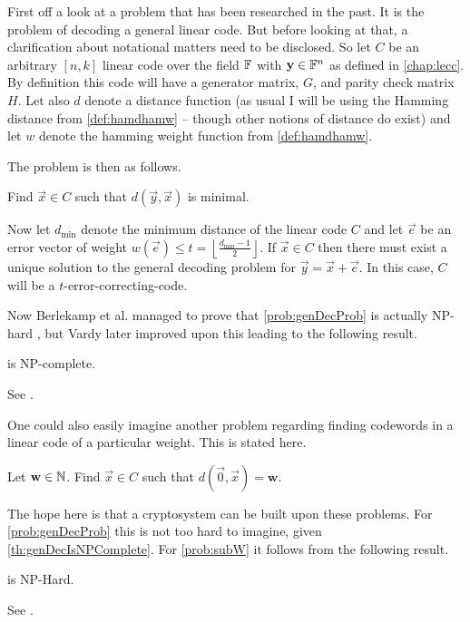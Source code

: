 First off a look at a problem that has been researched in the past. It is the problem of decoding a general linear code. But before looking at that, a clarification about notational matters need to be disclosed.
So let $C$ be an arbitrary $\left[n,k\right]$ linear code over the field $\mathbb{F}$ with $\boldsymbol{\mathrm{y}} \in \mathbb{F}^n$ as defined in \cref{chap:lecc}. By definition this code will have a generator matrix, $G$, and parity check matrix $H$. Let also $d$ denote a distance function (as usual I will be using the Hamming distance from \cref{def:hamdhamw} -- though other notions of distance do exist) and let $w$ denote the hamming weight function from \cref{def:hamdhamw}.

The problem is then as follows.
\begin{prob}
\label{prob:genDecProb}
	Find $\vec{x} \in C$ such that $d\left(\vec{y},\vec{x}\right)$ is minimal.
\end{prob}

Now let $d_{\min}$ denote the minimum distance of the linear code $C$ and let $\vec{e}$ be an error vector of weight $w\left(\vec{e}\right) \leq t = \left\lfloor \frac{d_{\min} - 1}{2} \right\rfloor$. If $\vec{x} \in C$ then there must exist a unique solution to the general decoding problem for $\vec{y} = \vec{x} + \vec{e}$. In this case, $C$ will be a $t$-error-correcting-code.

Now Berlekamp et al. managed to prove that \cref{prob:genDecProb} is actually NP-hard \cite{BMT}, but Vardy later improved upon this leading to the following result.
\begin{thm}
\label{th:genDecIsNPComplete}
	 is NP-complete.
	\begin{Proof}
		See \cite{vardy}.
	\end{Proof}
\end{thm}

One could also easily imagine another problem regarding finding codewords in a linear code of a particular weight. This is stated here.
\begin{prob}
\label{prob:subW}
	Let $\mathbf{w} \in \mathbb{N}$. Find $\vec{x} \in C$ such that $d\left(\vec{0}, \vec{x}\right) = \mathbf{w}$.
\end{prob}

The hope here is that a cryptosystem can be built upon these problems. For \cref{prob:genDecProb} this is not too hard to imagine, given \cref{th:genDecIsNPComplete}. For \cref{prob:subW} it follows from the following result.
\begin{thm}
\label{th:subWIsNPHard}
	 is NP-Hard.
	\begin{Proof}
		See \cite{BMT}.
	\end{Proof}
\end{thm}

